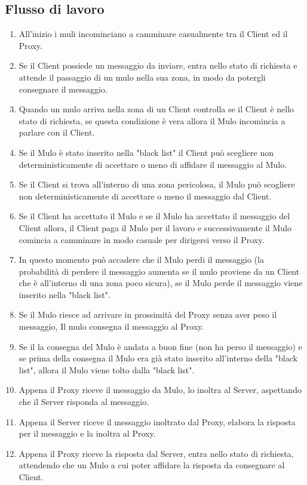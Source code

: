 \documentclass[13pt,a4paper]{article}
\begin{document}
\subsection{Flusso di lavoro}
\begin{enumerate}
	\item All'inizio i muli incominciano a camminare casualmente tra il Client ed il Proxy.
	\item  Se il Client possiede un messaggio da inviare, entra nello stato di richiesta e attende il passaggio di un mulo nella sua zona, in modo da potergli consegnare il messaggio.
	\item Quando un mulo arriva nella zona di un Client controlla se il Client è nello stato di richiesta, se questa condizione è vera allora il Mulo incomincia a parlare con il Client.
	\item Se il Mulo è stato inserito nella "black list" il Client può scegliere non deterministicamente di accettare o meno di affidare il messaggio al Mulo.
	\item Se il Client si trova all'interno di una zona pericolosa, il Mulo può scogliere non deterministicamente di accettare o meno il messaggio dal Client. 
	\item Se il Client ha accettato il Mulo e se il Mulo ha accettato il messaggio del Client allora, il Client paga il Mulo per il lavoro e successivamente il Mulo comincia a camminare in modo casuale per dirigersi verso il Proxy.
	\item In questo momento può accadere che il Mulo perdi il messaggio (la probabilità di perdere il messaggio aumenta se il mulo proviene da un Client che è all'interno di una zona poco sicura), se il Mulo perde il messaggio viene inserito nella "black list".
	\item Se il Mulo riesce ad arrivare in prossimità del Proxy senza aver peso il messaggio, Il mulo consegna il messaggio al Proxy.
	\item Se il la consegna del Mulo è andata a buon fine (non ha perso il messaggio) e se prima della consegna il Mulo era già stato inserito all'interno della "black list", allora il Mulo viene tolto dalla "black list".
	\item Appena il Proxy riceve il messaggio da Mulo, lo inoltra al Server, aspettando che il Server risponda al messaggio.
	\item Appena il Server riceve il messaggio inoltrato dal Proxy, elabora la risposta per il messaggio e la inoltra al Proxy.
	\item Appena il Proxy riceve la risposta dal Server, entra nello stato di richiesta, attendendo che un Mulo a cui poter affidare la risposta da consegnare al Client.

\end{enumerate}
\end{document}
